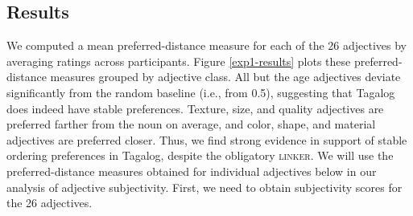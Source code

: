 \documentclass[12pt,letterpaper]{article}
\begin{document}


\subsection{Results}

We computed a mean preferred-distance measure for each of the 26 adjectives by averaging ratings across participants. Figure \ref{exp1-results} plots these preferred-distance measures grouped by adjective class. All but the age adjectives deviate significantly from the random baseline (i.e., from 0.5), suggesting that Tagalog does indeed have stable preferences. Texture, size, and quality adjectives are preferred farther from the noun on average, and color, shape, and material adjectives are preferred closer. Thus, we find strong evidence in support of stable ordering preferences in Tagalog, despite the obligatory \textsc{linker}. We will use the preferred-distance measures obtained for individual adjectives below in our analysis of adjective subjectivity. First, we need to obtain subjectivity scores for the 26 adjectives.

\end{document}
